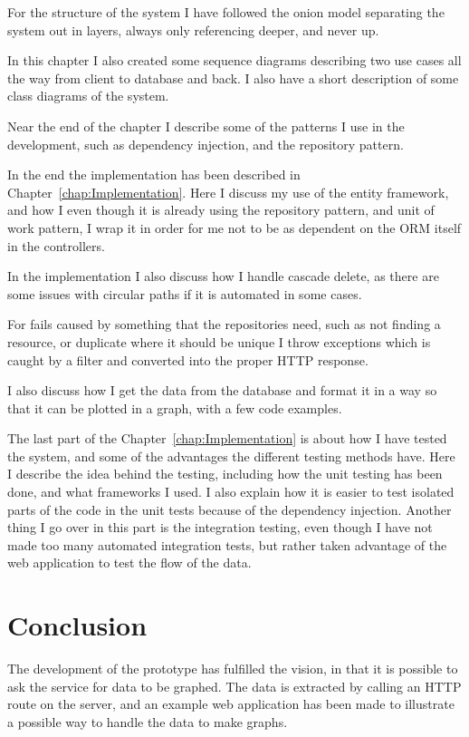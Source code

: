 For the structure of the system I have followed the onion model separating the
system out in layers, always only referencing deeper, and never up.

In this chapter I also created some sequence diagrams describing two use cases
all the way from client to database and back. I also have a short description of
some class diagrams of the system.

Near the end of the chapter I describe some of the patterns I use in the
development, such as dependency injection, and the repository pattern.

In the end the implementation has been described in
Chapter~\ref{chap:Implementation}. Here I discuss my use of the entity
framework, and how I even though it is already using the repository pattern, and
unit of work pattern, I wrap it in order for me not to be as dependent on the
ORM itself in the controllers.

In the implementation I also discuss how I handle cascade delete, as there are
some issues with circular paths if it is automated in some cases.

For fails caused by something that the repositories need, such as not finding a
resource, or duplicate where it should be unique I throw exceptions which is caught by a filter
and converted into the proper HTTP response.

I also discuss how I get the data from the database and format it in a way so
that it can be plotted in a graph, with a few code examples.

The last part of the Chapter~\ref{chap:Implementation} is about how I have
tested the system, and some of the advantages the different testing methods
have. Here I describe the idea behind the testing, including how the unit
testing has been done, and what frameworks I used. I also explain how it is
easier to test isolated parts of the code in the unit tests because of the
dependency injection. Another thing I go over in this part is the integration 
testing, even though I have not made too many automated integration tests, but
rather taken advantage of the web application to test the flow of the data.

\section{Conclusion}
The development of the prototype has fulfilled the vision, in that it is
possible to ask the service for data to be graphed. The data is extracted by
calling an HTTP route on the server, and an example web application has been
made to illustrate a possible way to handle the data to make graphs.

